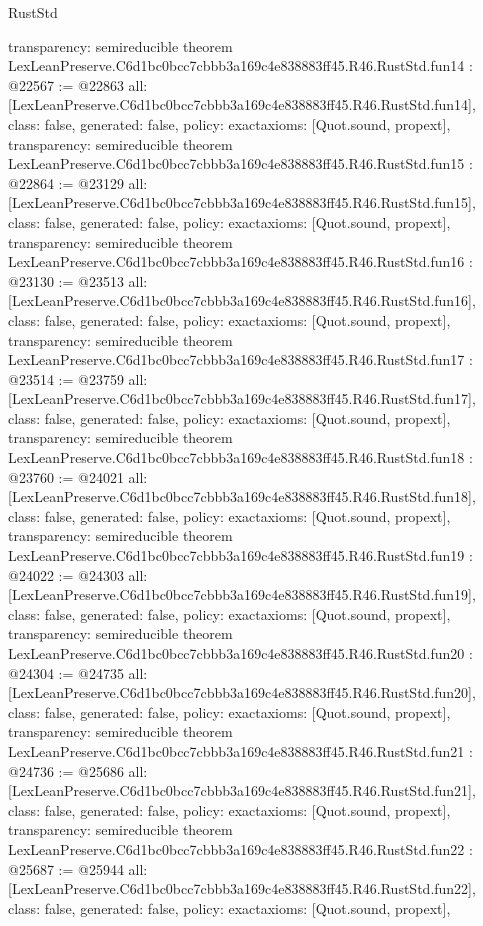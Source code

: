 \begin{lexlean}{RustStd}
\begin{coremodule}
{  transparency: semireducible
}
theorem LexLeanPreserve.C6d1bc0bcc7cbbb3a169c4e838883ff45.R46.RustStd.fun14 : @22567 := @22863 {
  all: [LexLeanPreserve.C6d1bc0bcc7cbbb3a169c4e838883ff45.R46.RustStd.fun14],
  class: false,
  generated: false,
  policy: exact{axioms: [Quot.sound, propext]},
  transparency: semireducible
}
theorem LexLeanPreserve.C6d1bc0bcc7cbbb3a169c4e838883ff45.R46.RustStd.fun15 : @22864 := @23129 {
  all: [LexLeanPreserve.C6d1bc0bcc7cbbb3a169c4e838883ff45.R46.RustStd.fun15],
  class: false,
  generated: false,
  policy: exact{axioms: [Quot.sound, propext]},
  transparency: semireducible
}
theorem LexLeanPreserve.C6d1bc0bcc7cbbb3a169c4e838883ff45.R46.RustStd.fun16 : @23130 := @23513 {
  all: [LexLeanPreserve.C6d1bc0bcc7cbbb3a169c4e838883ff45.R46.RustStd.fun16],
  class: false,
  generated: false,
  policy: exact{axioms: [Quot.sound, propext]},
  transparency: semireducible
}
theorem LexLeanPreserve.C6d1bc0bcc7cbbb3a169c4e838883ff45.R46.RustStd.fun17 : @23514 := @23759 {
  all: [LexLeanPreserve.C6d1bc0bcc7cbbb3a169c4e838883ff45.R46.RustStd.fun17],
  class: false,
  generated: false,
  policy: exact{axioms: [Quot.sound, propext]},
  transparency: semireducible
}
theorem LexLeanPreserve.C6d1bc0bcc7cbbb3a169c4e838883ff45.R46.RustStd.fun18 : @23760 := @24021 {
  all: [LexLeanPreserve.C6d1bc0bcc7cbbb3a169c4e838883ff45.R46.RustStd.fun18],
  class: false,
  generated: false,
  policy: exact{axioms: [Quot.sound, propext]},
  transparency: semireducible
}
theorem LexLeanPreserve.C6d1bc0bcc7cbbb3a169c4e838883ff45.R46.RustStd.fun19 : @24022 := @24303 {
  all: [LexLeanPreserve.C6d1bc0bcc7cbbb3a169c4e838883ff45.R46.RustStd.fun19],
  class: false,
  generated: false,
  policy: exact{axioms: [Quot.sound, propext]},
  transparency: semireducible
}
theorem LexLeanPreserve.C6d1bc0bcc7cbbb3a169c4e838883ff45.R46.RustStd.fun20 : @24304 := @24735 {
  all: [LexLeanPreserve.C6d1bc0bcc7cbbb3a169c4e838883ff45.R46.RustStd.fun20],
  class: false,
  generated: false,
  policy: exact{axioms: [Quot.sound, propext]},
  transparency: semireducible
}
theorem LexLeanPreserve.C6d1bc0bcc7cbbb3a169c4e838883ff45.R46.RustStd.fun21 : @24736 := @25686 {
  all: [LexLeanPreserve.C6d1bc0bcc7cbbb3a169c4e838883ff45.R46.RustStd.fun21],
  class: false,
  generated: false,
  policy: exact{axioms: [Quot.sound, propext]},
  transparency: semireducible
}
theorem LexLeanPreserve.C6d1bc0bcc7cbbb3a169c4e838883ff45.R46.RustStd.fun22 : @25687 := @25944 {
  all: [LexLeanPreserve.C6d1bc0bcc7cbbb3a169c4e838883ff45.R46.RustStd.fun22],
  class: false,
  generated: false,
  policy: exact{axioms: [Quot.sound, propext]},
}
\end{coremodule}
\end{lexlean}
